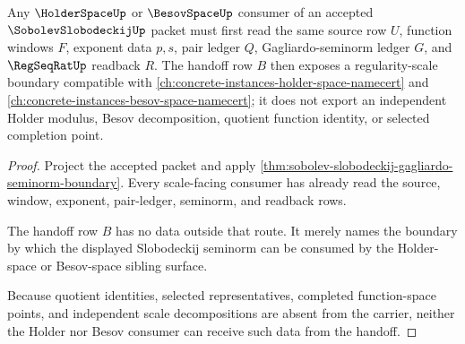 \begin{theorem}
\label{thm:sobolev-slobodeckij-holder-besov-handoff}
Any $\HolderSpaceUp$ or $\BesovSpaceUp$ consumer of an accepted $\SobolevSlobodeckijUp$ packet must first read the same source row $U$, function windows $F$, exponent data $p,s$, pair ledger $Q$, Gagliardo-seminorm ledger $G$, and $\RegSeqRatUp$ readback $R$. The handoff row $B$ then exposes a regularity-scale boundary compatible with \autoref{ch:concrete-instances-holder-space-namecert} and \autoref{ch:concrete-instances-besov-space-namecert}; it does not export an independent Holder modulus, Besov decomposition, quotient function identity, or selected completion point.
\end{theorem}
\begin{proof}
Project the accepted packet and apply \autoref{thm:sobolev-slobodeckij-gagliardo-seminorm-boundary}. Every scale-facing consumer has already read the source, window, exponent, pair-ledger, seminorm, and readback rows.

The handoff row $B$ has no data outside that route. It merely names the boundary by which the displayed Slobodeckij seminorm can be consumed by the Holder-space or Besov-space sibling surface.

Because quotient identities, selected representatives, completed function-space points, and independent scale decompositions are absent from the carrier, neither the Holder nor Besov consumer can receive such data from the handoff.
\end{proof}




